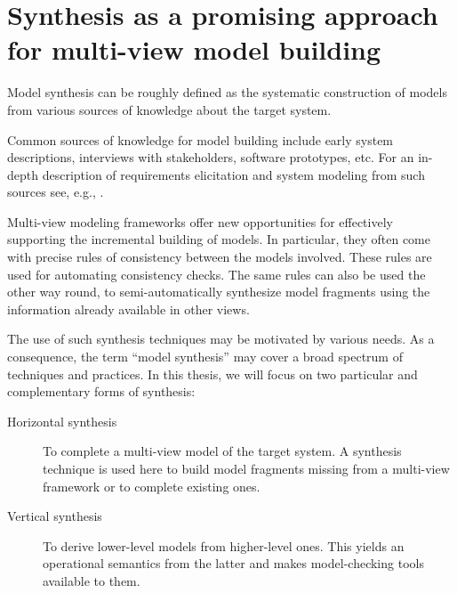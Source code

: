\section{Synthesis as a promising approach for multi-view model building\label{section:intro-synthesis}}

Model synthesis can be roughly defined as the systematic construction of models from various sources of knowledge about the target system. 

Common sources of knowledge for model building include early system descriptions, interviews with stakeholders, software prototypes, etc. For an in-depth description of requirements elicitation and system modeling from such sources see, e.g., \cite{VanLamsweerde:2009}.

Multi-view modeling frameworks offer new opportunities for effectively supporting the incremental building of models. In particular, they often come with precise rules of consistency between the models involved. These rules are used for automating consistency checks. The same rules can also be used the other way round, to semi-automatically synthesize model fragments using the information already available in other views.

The use of such synthesis techniques may be motivated by various needs. As a consequence, the term ``model synthesis'' may cover a broad spectrum of techniques and practices. In this thesis, we will focus on two particular and complementary forms of synthesis:
\begin{description}
\item[Horizontal synthesis] To complete a multi-view model of the target system. A synthesis technique is used here to build model fragments missing from a multi-view framework or to complete existing ones.
\item[Vertical synthesis] To derive lower-level models from higher-level ones. This yields an operational semantics from the latter and makes model-checking tools available to them.
\end{description}

